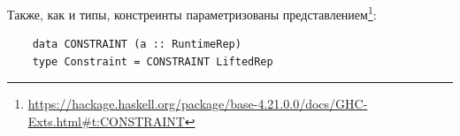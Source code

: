 Также, как и типы, констреинты параметризованы представлением\footnote{\url{https://hackage.haskell.org/package/base-4.21.0.0/docs/GHC-Exts.html\#t:CONSTRAINT}}:
\begin{verbatim}
    data CONSTRAINT (a :: RuntimeRep)
    type Constraint = CONSTRAINT LiftedRep
\end{verbatim}

%
%
%
%
%
%
